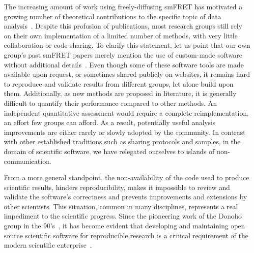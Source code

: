 \documentclass[10pt,letterpaper]{article}
\begin{document}
The increasing amount of work using freely-diffusing smFRET has motivated
a growing number of theoretical contributions to the specific topic of data
analysis~\cite{Fries_1998,Eggeling_2001,Zhang_2005,Gopich_2005,Lee_2005,Nir_2006,Antonik2006,Gopich_2007,Gopich_2008,Camley_2009,Santoso_2010,Torella_2011,Tomov_2012}.
Despite this profusion of publications, most research groups still rely on
their own implementation of a limited number of methods, with very little
collaboration or code sharing.
To clarify this statement, let us point that our own group's past smFRET papers
merely mention the use of custom-made software without additional details~\cite{Lee_2005,Nir_2006}.
Even though some of these software tools are made available upon request,
or sometimes shared publicly on websites,
it remains hard to reproduce and validate results from different groups,
let alone build upon them.
Additionally, as new methods are proposed in literature,
it is generally difficult to quantify their performance compared to other methods.
An independent quantitative assessment
would require a complete reimplementation, an effort few groups can afford.
As a result, potentially useful analysis improvements
are either rarely or slowly adopted by the community.
In contrast with other established traditions such as
sharing protocols and samples, in the domain of scientific software,
we have relegated ourselves to islands of non-communication.

From a more general standpoint, the non-availability of the code
used to produce scientific results, hinders reproducibility,
makes it impossible to review and validate the software's correctness
and prevents improvements and extensions by other scientists.
This situation, common in many disciplines,
represents a real impediment to the scientific progress.
Since the pioneering work of the Donoho group in the 90's~\cite{Buckheit_1995},
it has become evident that developing and maintaining open source scientific software
for reproducible research is a critical requirement of the modern
scientific enterprise~\cite{Ince_2012,Vihinen_2015}.

\end{document}
